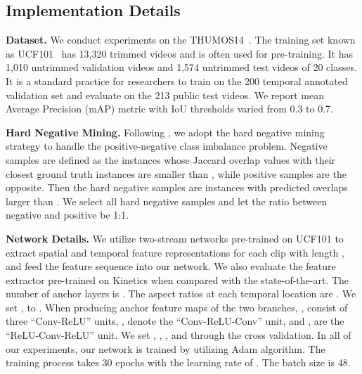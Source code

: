 \documentclass{article}
\begin{document}
\subsection{Implementation Details}
\label{implementation}
\textbf{Dataset.}
We conduct experiments on the THUMOS14~\cite{THUMOS14}.
The training set known as UCF101~\cite{soomro2012ucf101} has 13,320 trimmed videos and is often used for pre-training.
It has 1,010 untrimmed validation videos and 1,574 untrimmed test videos of 20 classes. It is a standard practice for researchers to train on the 200 temporal annotated validation set and evaluate on the 213 public test videos.
We report mean Average Precision (mAP) metric with IoU thresholds varied from 0.3 to 0.7.



\textbf{Hard Negative Mining.}
Following \cite{lin2017single}, we adopt the hard negative mining strategy to handle the positive-negative class imbalance problem. 
Negative samples are defined as the instances whose Jaccard overlap values with their closest ground truth instances are smaller than , while positive samples are the opposite. Then the hard negative samples are instances with predicted overlaps larger than . We select all hard negative samples and let the ratio between negative and positive be 1:1.


\textbf{Network Details.}
We utilize two-stream networks \cite{simonyan2014two} pre-trained on UCF101 \cite{soomro2012ucf101} to extract spatial and temporal feature representations for each clip with length , and feed the feature sequence into our network. We also evaluate the feature extractor pre-trained on Kinetics \cite{kay2017kinetics} when compared with the state-of-the-art.
The number of anchor layers  is . The aspect ratios at each temporal location are . We set ,  to .
When producing anchor feature maps of the two branches, ,  consist of three ``Conv-ReLU'' units, ,  denote the ``Conv-ReLU-Conv'' unit, and ,  are the ``ReLU-Conv-ReLU'' unit.
We set , , , and  through the cross validation.
In all of our experiments, our network is trained by utilizing Adam algorithm. The training process takes 30 epochs with the learning rate of . The batch size is 48. 
\end{document}
